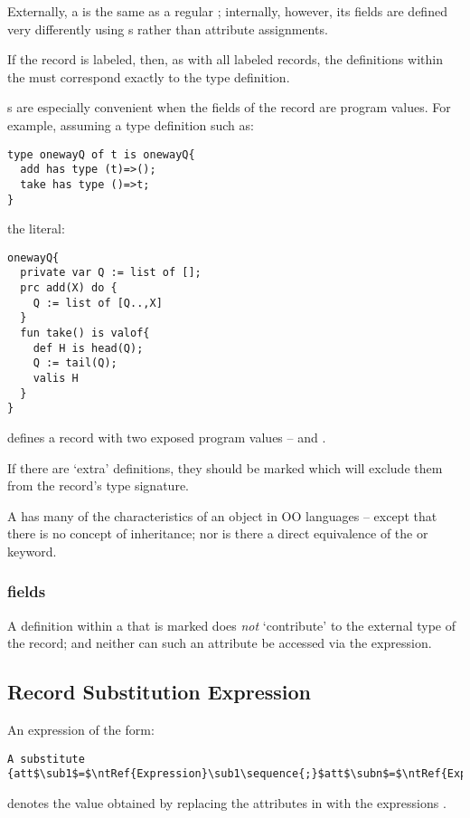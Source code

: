 Externally, a  is the same as a regular ; internally, however, its fields are defined very differently using s rather than attribute assignments.

If the record is labeled, then, as with all labeled records, the definitions within the  must correspond exactly to the type definition.

s are especially convenient when the fields of the record are program values. For example, assuming a type definition such as:
\begin{lstlisting}
type onewayQ of t is onewayQ{
  add has type (t)=>();
  take has type ()=>t;
}
\end{lstlisting}
the literal:
\begin{lstlisting}
onewayQ{
  private var Q := list of [];
  prc add(X) do {
    Q := list of [Q..,X]
  }
  fun take() is valof{
    def H is head(Q);
    Q := tail(Q);
    valis H
  }
}
\end{lstlisting}
defines a  record with two exposed program values --  and .

\begin{aside}
If there are `extra' definitions, they should be marked  which will exclude them from the record's type signature.
\end{aside}

\begin{aside}
A  has many of the characteristics of an object in OO languages -- except that there is no concept of inheritance; nor is there a direct equivalence of the  or  keyword.
\end{aside}

\subsubsection{ fields}
\label{privateField}
A definition within a  that is marked  does \emph{not} `contribute' to the external type of the record; and neither can such an attribute be accessed via the  expression. 

\subsection{Record Substitution Expression}
\label{recordOverride}
An expression of the form:
\begin{lstlisting}[mathescape=true]
A substitute {att$\sub1$=$\ntRef{Expression}\sub1\sequence{;}$att$\subn$=$\ntRef{Expression}\subn$}
\end{lstlisting}
denotes the value obtained by replacing the attributes \subi{} in  with the expressions \subi.

